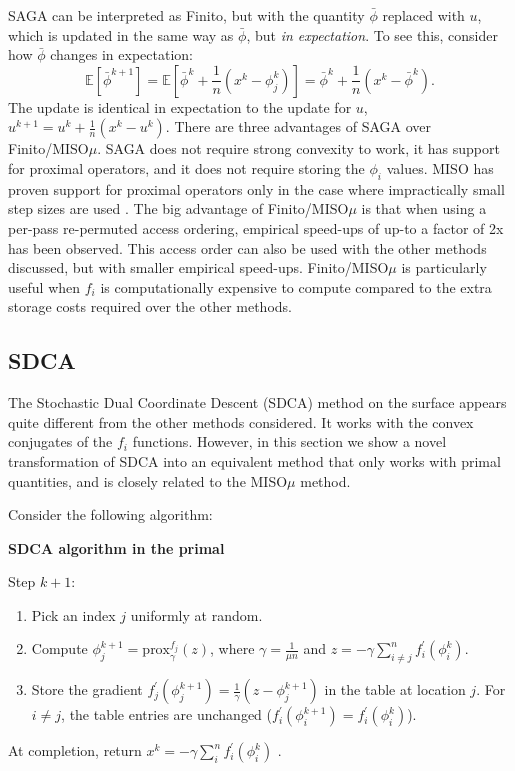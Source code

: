 \documentclass{article}
\newcommand{\stepsize}{\gamma} %
\begin{document}
SAGA can be interpreted as Finito, but with the quantity $\bar{\phi}$ replaced with $u$, which is updated in the same way as $\bar{\phi}$, but \emph{in expectation}. To see this, consider how $\bar{\phi}$ changes in expectation:
\[
	\mathbb{E} \left[ \bar{\phi}^{k+1} \right]   =  \mathbb{E} \left[ \bar{\phi}^k + \frac{1}{n} \left( x^{k}  - \phi^{k}_{j}   \right) \right]
	 = \bar{\phi}^k + \frac{1}{n} \left( x^{k}  - \bar{\phi}^k   \right). 
\]
The update is identical in expectation to the update for $u$, $u^{k+1}=u^{k}+\frac{1}{n}(x^{k}-u^{k})$. 
There are three advantages of SAGA over Finito/MISO$\mu$. SAGA does not require strong convexity to work, it has support for proximal operators, and it does not require storing the $\phi_i$ values. MISO has proven support for proximal operators only in the case where impractically small step sizes are used \citep{miso2}.
The big advantage of Finito/MISO$\mu$ is that when using a per-pass re-permuted access ordering, empirical speed-ups of up-to a factor of 2x has been observed. This access order can also be used with the other methods discussed, but with smaller empirical speed-ups. Finito/MISO$\mu$ is particularly useful when $f_i$ is computationally expensive to compute compared to the extra storage costs required over the other methods.

\subsection*{SDCA}
\label{subsec:sdca}
The Stochastic Dual Coordinate Descent (SDCA) \citep{SDCA} method on the surface appears quite different from the other methods considered. It works with the convex conjugates of the $f_{i}$ functions. However, in this section we show a novel transformation of SDCA into an equivalent method that only works with primal quantities, and is closely related to the MISO$\mu$ method.

Consider the following algorithm:
\begin{framed}
\textbf{SDCA algorithm in the primal}

Step $k+1$:
\begin{enumerate}
  \setlength{\itemsep}{1pt}
\item Pick an index $j$ uniformly at random.
\item Compute $\phi_{j}^{k+1}=\text{prox}_{\stepsize}^{f_{j}}(z)$,
where $\stepsize=\frac{1}{\mu n}$ and
$z=-\stepsize  \sum^{n}_{i\neq j}f_{i}^{\prime}(\phi_{i}^{k})$.
\item Store the gradient $f_{j}^{\prime}(\phi_{j}^{k+1})=\frac{1}{\stepsize}\left(z-\phi_{j}^{k+1}\right)$
in the table at location $j$.
For $i\neq j$, the table entries are unchanged ($f_{i}^{\prime}(\phi_{i}^{k+1})=f_{i}^{\prime}(\phi_{i}^{k})$).
\end{enumerate}
At completion, return $x^{k}=-\stepsize \sum_{i}^{n}f_{i}^{\prime}(\phi_{i}^{k})$
 .
\end{framed}
\end{document}
